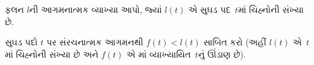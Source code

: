 \begin{prob}
  ફલન $l$ની આગમનાત્મક વ્યાખ્યા આપો, જ્યાં
  $l(t)$ એ સુઘડ પદ~$t$માં ચિહ્નોની સંખ્યા છે.
\end{prob}

\begin{prob}
  સુઘડ પદો $t$ પર સંરચનાત્મક આગમનથી
  $f(t) < l(t)$ સાબિત કરો (અહીં $l(t)$
  એ~$t$માં ચિહ્નોની સંખ્યા છે અને $f(t)$
  એ માં
  વ્યાખ્યાયિત~$t$નું ઊંડાણ છે).
\end{prob}
\endgroup


\OLEndChapterHook
\endgroup


\OLEndPartHook
